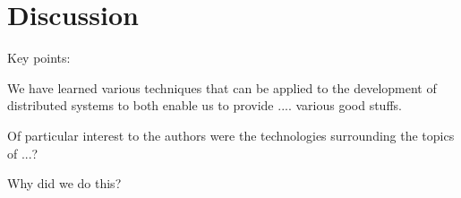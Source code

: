 \chapter{Discussion} \label{ch:discussion}

Key points:

We have learned various techniques that can be applied to the development of distributed systems to both enable us to provide .... various good stuffs.

Of particular interest to the authors were the technologies surrounding the topics of ...?

Why did we do this?
